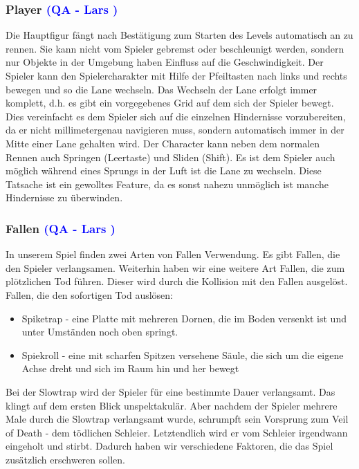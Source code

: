 \documentclass[12pt]{article}
\begin{document}
\vspace{1cm}
\subsubsection{Player \textcolor{blue}{(QA - Lars )}}

Die Hauptfigur fängt nach Bestätigung zum Starten des Levels automatisch an zu rennen. Sie kann nicht vom Spieler gebremst oder beschleunigt werden, sondern nur Objekte in der Umgebung haben Einfluss auf die Geschwindigkeit.
Der Spieler kann den Spielercharakter mit Hilfe der Pfeiltasten nach links und rechts bewegen und so die Lane wechseln. Das Wechseln der Lane erfolgt immer komplett, d.h. es gibt ein vorgegebenes Grid auf dem sich der Spieler bewegt. Dies vereinfacht es dem Spieler sich auf die einzelnen Hindernisse vorzubereiten, da er nicht millimetergenau navigieren muss, sondern automatisch immer in der Mitte einer Lane gehalten wird. Der Character kann neben dem normalen Rennen auch Springen (Leertaste) und Sliden (Shift). Es ist dem Spieler auch möglich während eines Sprungs in der Luft ist die Lane zu wechseln. Diese Tatsache ist ein gewolltes Feature, da es sonst nahezu unmöglich ist manche Hindernisse zu überwinden. 

\vspace{1cm}
\subsubsection{Fallen \textcolor{blue}{(QA - Lars )}}

In unserem Spiel finden zwei Arten von Fallen Verwendung. Es gibt Fallen, die den Spieler verlangsamen. Weiterhin haben wir eine
weitere Art Fallen, die zum plötzlichen Tod führen. Dieser wird durch die Kollision mit den Fallen ausgelöst. Fallen, die den sofortigen Tod auslösen:
\begin{itemize}
	\item Spiketrap - eine Platte mit mehreren Dornen, die im Boden versenkt ist und unter Umständen noch oben springt.
	\item Spiekroll - eine mit scharfen Spitzen versehene Säule, die sich um die eigene Achse dreht und sich im Raum hin und her bewegt
\end{itemize}
Bei der Slowtrap wird der Spieler für eine bestimmte Dauer verlangsamt. Das klingt auf dem ersten Blick unspektakulär. Aber nachdem der Spieler
mehrere Male durch die Slowtrap verlangsamt wurde, schrumpft sein Vorsprung zum \glqq Veil of Death\grqq{} - dem tödlichen Schleier. Letztendlich wird er vom Schleier irgendwann eingeholt und stirbt. Dadurch haben wir verschiedene Faktoren, die das Spiel zusätzlich erschweren sollen.
\end{document}
